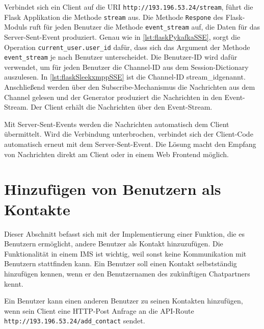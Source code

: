 \documentclass[a4paper,titlepage,halfparskip,12pt]{scrreprt}
\begin{document}
\begin{onehalfspacing}
Verbindet sich ein Client auf die \acs{URI} \texttt{http://193.196.53.24/stream}, führt die Flask Applikation die Methode \texttt{stream} aus. Die Methode \texttt{Respone} des Flask-Moduls ruft für jeden Benutzer die Methode \texttt{event\_stream} auf, die Daten für das Server-Sent-Event produziert. Genau wie in \autoref{lst:flaskPykafkaSSE}, sorgt die Operation \texttt{current\_user.user\_id} dafür, dass sich das Argument der Methode \texttt{event\_stream} je nach Benutzer unterscheidet. Die Benutzer-ID wird dafür verwendet, um für jeden Benutzer die Channel-ID aus dem Session-Dictionary auszulesen. In \autoref{lst:flaskSleekxmppSSE} ist die Channel-ID \glqq stream\_id\grqq genannt. Anschließend werden über den Subscribe-Mechanismus die Nachrichten aus dem Channel gelesen und der Generator produziert die Nachrichten in den Event-Stream. Der Client erhält die Nachrichten über den Event-Stream.

Mit Server-Sent-Events werden die Nachrichten automatisch dem Client übermittelt. Wird die Verbindung unterbrochen, verbindet sich der Client-Code automatisch erneut mit dem Server-Sent-Event. Die Lösung macht den Empfang von Nachrichten direkt am Client oder in einem Web Frontend möglich.

\section{Hinzufügen von Benutzern als Kontakte}

Dieser Abschnitt befasst sich mit der Implementierung einer Funktion, die es Benutzern ermöglicht, andere Benutzer als Kontakt hinzuzufügen. Die Funktionalität in einem \acs{IMS} ist wichtig, weil sonst keine Kommunikation mit Benutzern stattfinden kann. Ein Benutzer soll einen Kontakt selbstständig hinzufügen kennen, wenn er den Benutzernamen des zukünftigen Chatpartners kennt.

Ein Benutzer kann einen anderen Benutzer zu seinen Kontakten hinzufügen, wenn sein Client eine \acs{HTTP}-Post Anfrage an die \acs{API}-Route \texttt{http://193.196.53.24/add\_contact} sendet.


\end{onehalfspacing}
\end{document}
